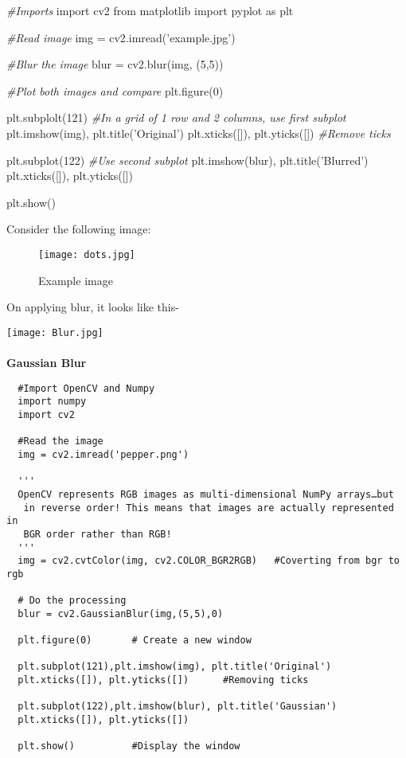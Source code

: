 \documentclass[]{article}
\newenvironment{Shaded}{}{}
\newcommand{\DecValTok}[1]{\textcolor[rgb]{0.25,0.63,0.44}{{#1}}}
\newcommand{\StringTok}[1]{\textcolor[rgb]{0.25,0.44,0.63}{{#1}}}
\newcommand{\ImportTok}[1]{{#1}}
\newcommand{\CommentTok}[1]{\textcolor[rgb]{0.38,0.63,0.69}{\textit{{#1}}}}
\newcommand{\OperatorTok}[1]{\textcolor[rgb]{0.40,0.40,0.40}{{#1}}}
\newcommand{\NormalTok}[1]{{#1}}
\begin{document}
\begin{Shaded}
\begin{Highlighting}[]
    \CommentTok{#Imports}
    \ImportTok{import} \NormalTok{cv2}
    \ImportTok{from} \NormalTok{matplotlib }\ImportTok{import} \NormalTok{pyplot }\ImportTok{as} \NormalTok{plt}
    
    \CommentTok{#Read image}
    \NormalTok{img }\OperatorTok{=} \NormalTok{cv2.imread(}\StringTok{'example.jpg'}\NormalTok{)}

    \CommentTok{#Blur the image}
    \NormalTok{blur }\OperatorTok{=} \NormalTok{cv2.blur(img, (}\DecValTok{5}\NormalTok{,}\DecValTok{5}\NormalTok{))}

    \CommentTok{#Plot both images and compare}
    \NormalTok{plt.figure(}\DecValTok{0}\NormalTok{)}
    
    \NormalTok{plt.subplolt(}\DecValTok{121}\NormalTok{) }\CommentTok{#In a grid of 1 row and 2 columns, use first subplot}
    \NormalTok{plt.imshow(img), plt.title(}\StringTok{'Original'}\NormalTok{)}
    \NormalTok{plt.xticks([]), plt.yticks([]) }\CommentTok{#Remove ticks}

    \NormalTok{plt.subplot(}\DecValTok{122}\NormalTok{) }\CommentTok{#Use second subplot}
    \NormalTok{plt.imshow(blur), plt.title(}\StringTok{'Blurred'}\NormalTok{)}
    \NormalTok{plt.xticks([]), plt.yticks([])}

    \NormalTok{plt.show()}
\end{Highlighting}
\end{Shaded}

Consider the following image:

\begin{figure}[htbp]
\centering
\texttt{[image: dots.jpg]}
\caption{Example image}
\end{figure}

On applying blur, it looks like this-

\texttt{[image: Blur.jpg]} \\ \\
\textbf{\LARGE Gaussian Blur}

\begin{verbatim}
  #Import OpenCV and Numpy
  import numpy
  import cv2

  #Read the image
  img = cv2.imread('pepper.png')

  '''
  OpenCV represents RGB images as multi-dimensional NumPy arrays…but
   in reverse order! This means that images are actually represented in 
   BGR order rather than RGB!
  '''
  img = cv2.cvtColor(img, cv2.COLOR_BGR2RGB)   #Coverting from bgr to rgb

  # Do the processing
  blur = cv2.GaussianBlur(img,(5,5),0)

  plt.figure(0)       # Create a new window

  plt.subplot(121),plt.imshow(img), plt.title('Original')
  plt.xticks([]), plt.yticks([])      #Removing ticks

  plt.subplot(122),plt.imshow(blur), plt.title('Gaussian')
  plt.xticks([]), plt.yticks([])

  plt.show()          #Display the window
\end{verbatim}
\end{document}
